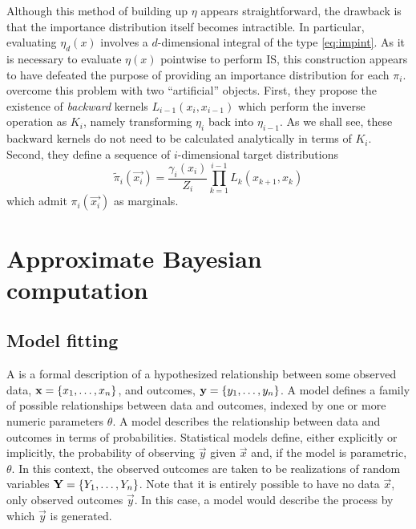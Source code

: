 Although this method of building up $\eta$ appears straightforward, the
drawback is that the importance distribution itself becomes intractible. In
particular, evaluating $\eta_d(x)$ involves a $d$-dimensional integral of the
type \cref{eq:impint}. As it is necessary to evaluate $\eta(x)$ pointwise to
perform \gls{IS}, this construction appears to have defeated the purpose of
providing an importance distribution for each $\pi_i$.
\textcite{del2006sequential} overcome this problem with two ``artificial''
objects. First, they propose the existence of \textit{backward} kernels
$L_{i-1}(x_i, x_{i-1})$ which perform the inverse operation as $K_i$, namely
transforming $\eta_i$ back into $\eta_{i-1}$. As we shall see, these backward
kernels do not need to be calculated analytically in terms of $K_i$. Second,
they define a sequence of $i$-dimensional target distributions
\[
  \tilde{\pi}_i(\vec{x_i}) = \frac{\gamma_i(x_i)}{Z_i} \prod_{k=1}^{i-1} L_k(x_{k+1}, x_k)
\]
which admit $\pi_i(\vec{x_i})$ as marginals.

\section{Approximate Bayesian computation}
\label{sec:abc}


\subsection{Model fitting}
\label{subsec:mfit}

A  is a formal description of a hypothesized
relationship between some observed data, $\mathbf{x} = \left\lbrace x_1, \ldots, x_n\right\rbrace$,
and outcomes, $\mathbf{y} = \left\lbrace y_1, \ldots, y_n\right\rbrace$. A  model
defines a family of possible relationships between data and outcomes, indexed
by one or more numeric parameters $\theta$. A  model
describes the relationship between data and outcomes in terms of probabilities.
Statistical models define, either explicitly or implicitly, the probability of
observing $\vec{y}$ given $\vec{x}$ and, if the model is parametric, $\theta$.
In this context, the observed outcomes are taken to be realizations of random
variables $\mathbf{Y} = \left\lbrace Y_1, \ldots, Y_n\right\rbrace$. Note that it is entirely possible
to have no data $\vec{x}$, only observed outcomes $\vec{y}$. In this case, a
model would describe the process by which $\vec{y}$ is generated.


